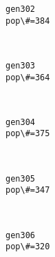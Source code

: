 \documentclass[11pt]{article}
\begin{document}
    \begin{Verbatim}[commandchars=\\\{\}]
gen302
pop\#=384

    \end{Verbatim}

    \begin{center}
    \end{center}
    { \hspace*{\fill} \\}
    
    \begin{Verbatim}[commandchars=\\\{\}]
gen303
pop\#=364

    \end{Verbatim}

    \begin{center}
    \end{center}
    { \hspace*{\fill} \\}
    
    \begin{Verbatim}[commandchars=\\\{\}]
gen304
pop\#=375

    \end{Verbatim}

    \begin{center}
    \end{center}
    { \hspace*{\fill} \\}
    
    \begin{Verbatim}[commandchars=\\\{\}]
gen305
pop\#=347

    \end{Verbatim}

    \begin{center}
    \end{center}
    { \hspace*{\fill} \\}
    
    \begin{Verbatim}[commandchars=\\\{\}]
gen306
pop\#=320

    \end{Verbatim}
\end{document}
